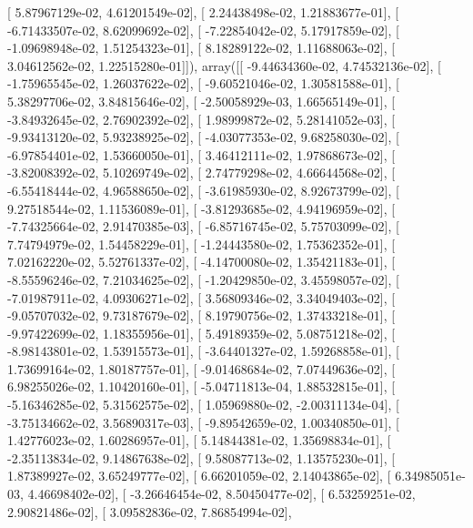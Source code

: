 \documentclass{article}
\begin{document}
       [  5.87967129e-02,   4.61201549e-02],
       [  2.24438498e-02,   1.21883677e-01],
       [ -6.71433507e-02,   8.62099692e-02],
       [ -7.22854042e-02,   5.17917859e-02],
       [ -1.09698948e-02,   1.51254323e-01],
       [  8.18289122e-02,   1.11688063e-02],
       [  3.04612562e-02,   1.22515280e-01]]), array([[ -9.44634360e-02,   4.74532136e-02],
       [ -1.75965545e-02,   1.26037622e-02],
       [ -9.60521046e-02,   1.30581588e-01],
       [  5.38297706e-02,   3.84815646e-02],
       [ -2.50058929e-03,   1.66565149e-01],
       [ -3.84932645e-02,   2.76902392e-02],
       [  1.98999872e-02,   5.28141052e-03],
       [ -9.93413120e-02,   5.93238925e-02],
       [ -4.03077353e-02,   9.68258030e-02],
       [ -6.97854401e-02,   1.53660050e-01],
       [  3.46412111e-02,   1.97868673e-02],
       [ -3.82008392e-02,   5.10269749e-02],
       [  2.74779298e-02,   4.66644568e-02],
       [ -6.55418444e-02,   4.96588650e-02],
       [ -3.61985930e-02,   8.92673799e-02],
       [  9.27518544e-02,   1.11536089e-01],
       [ -3.81293685e-02,   4.94196959e-02],
       [ -7.74325664e-02,   2.91470385e-03],
       [ -6.85716745e-02,   5.75703099e-02],
       [  7.74794979e-02,   1.54458229e-01],
       [ -1.24443580e-02,   1.75362352e-01],
       [  7.02162220e-02,   5.52761337e-02],
       [ -4.14700080e-02,   1.35421183e-01],
       [ -8.55596246e-02,   7.21034625e-02],
       [ -1.20429850e-02,   3.45598057e-02],
       [ -7.01987911e-02,   4.09306271e-02],
       [  3.56809346e-02,   3.34049403e-02],
       [ -9.05707032e-02,   9.73187679e-02],
       [  8.19790756e-02,   1.37433218e-01],
       [ -9.97422699e-02,   1.18355956e-01],
       [  5.49189359e-02,   5.08751218e-02],
       [ -8.98143801e-02,   1.53915573e-01],
       [ -3.64401327e-02,   1.59268858e-01],
       [  1.73699164e-02,   1.80187757e-01],
       [ -9.01468684e-02,   7.07449636e-02],
       [  6.98255026e-02,   1.10420160e-01],
       [ -5.04711813e-04,   1.88532815e-01],
       [ -5.16346285e-02,   5.31562575e-02],
       [  1.05969880e-02,  -2.00311134e-04],
       [ -3.75134662e-02,   3.56890317e-03],
       [ -9.89542659e-02,   1.00340850e-01],
       [  1.42776023e-02,   1.60286957e-01],
       [  5.14844381e-02,   1.35698834e-01],
       [ -2.35113834e-02,   9.14867638e-02],
       [  9.58087713e-02,   1.13575230e-01],
       [  1.87389927e-02,   3.65249777e-02],
       [  6.66201059e-02,   2.14043865e-02],
       [  6.34985051e-03,   4.46698402e-02],
       [ -3.26646454e-02,   8.50450477e-02],
       [  6.53259251e-02,   2.90821486e-02],
       [  3.09582836e-02,   7.86854994e-02],
\end{document}
